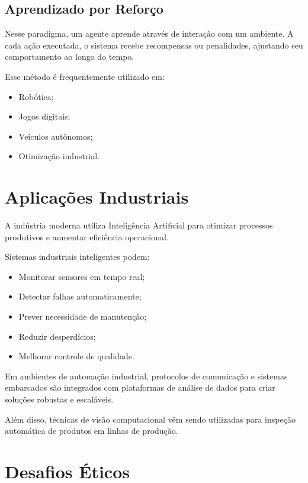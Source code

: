 \documentclass[11pt]{article}
\begin{document}
\subsection{Aprendizado por Reforço}

Nesse paradigma, um agente aprende através de interação com um ambiente. A cada ação
executada, o sistema recebe recompensas ou penalidades, ajustando seu comportamento ao
longo do tempo.

Esse método é frequentemente utilizado em:

\begin{itemize}
    \item Robótica;
    \item Jogos digitais;
    \item Veículos autônomos;
    \item Otimização industrial.
\end{itemize} 

\section{Aplicações Industriais}

A indústria moderna utiliza Inteligência Artificial para otimizar processos produtivos e aumentar
eficiência operacional.

Sistemas industriais inteligentes podem:

\begin{itemize}
    \item Monitorar sensores em tempo real;
    \item Detectar falhas automaticamente;
    \item Prever necessidade de manutenção;
    \item Reduzir desperdícios;
    \item Melhorar controle de qualidade.
\end{itemize}

Em ambientes de automação industrial, protocolos de comunicação e sistemas embarcados são
integrados com plataformas de análise de dados para criar soluções robustas e escaláveis.
 
Além disso, técnicas de visão computacional vêm sendo utilizadas para inspeção automática de
produtos em linhas de produção.

\section{Desafios Éticos}
\end{document}
